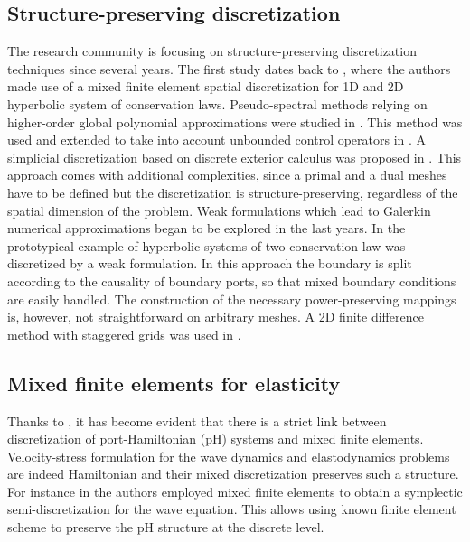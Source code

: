 \subsection{Structure-preserving discretization}

The research community is focusing on structure-preserving discretization techniques since several years. The first study dates back to \cite{golo2004hamiltonian}, where the authors made use of a mixed finite element spatial discretization for 1D and 2D hyperbolic system of conservation laws. Pseudo-spectral methods relying on higher-order global polynomial approximations were studied in \cite{moulla2012pseudo}. This method was used and extended to take into account unbounded control operators in \cite{cardoso2017}. A simplicial discretization based on discrete exterior calculus was proposed in \cite{seslija2012discrete}. This approach comes with additional complexities, since a primal and a dual meshes have to be defined but the discretization is structure-preserving, regardless of the spatial dimension of the problem. Weak formulations which lead to Galerkin numerical approximations began to be explored in the last years. In \cite{kotyczka2018weak} the prototypical example of hyperbolic systems of two conservation law was discretized by a weak formulation. In this approach the boundary is split according to the causality of boundary ports, so that mixed boundary conditions are easily handled. The construction of the necessary power-preserving mappings is, however, not straightforward on arbitrary meshes. A 2D finite difference method with staggered grids was used in \cite{trenchant2018}.

\subsection{Mixed finite elements for elasticity}

Thanks to \cite{cardoso2018pfem}, it has become evident that there is a strict link between  discretization of port-Hamiltonian (pH) systems and mixed finite elements. Velocity-stress formulation for the wave dynamics and elastodynamics problems are indeed Hamiltonian and their mixed discretization preserves such a structure. For instance in \cite{kirby2015} the authors employed mixed finite elements to obtain a  symplectic semi-discretization for the wave equation. This allows using known finite element scheme to preserve the pH structure at the discrete level. \\

